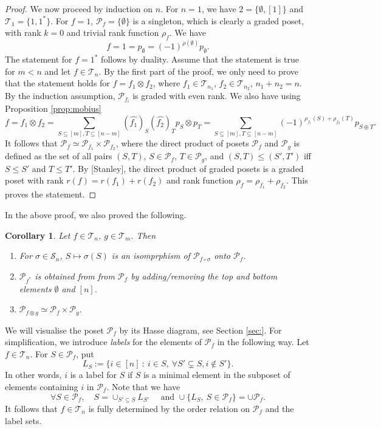 \documentclass[12pt]{article}
\newtheorem{coro}{Corollary}
\theoremstyle{definition}
\theoremstyle{remark}
\def\Te{\mathcal T}
\def\Pe{\mathcal P}
\def\permut{\mathscr{S}}
\begin{document}
\begin{proof}
We now proceed by induction on $n$. For $n=1$, we have $2=\{\emptyset, [1]\}$ and
$\Te_1=\{1,1^*\}$. For $f=1$, $\mathcal P_f=\{\emptyset\}$ is a singleton, which 
is clearly a graded poset, with rank $k=0$ and trivial rank function $\rho_f$.  We have
\[
f = 1=p_\emptyset=(-1)^{\rho(\emptyset)}p_\emptyset.
\]
The statement for $f=1^*$ follows by duality. Assume that the statement is true for $m<n$ and let $f\in \Te_n$.
 By the first part of the proof,  we only need to prove
that the statement holds for $f=f_1\otimes f_2$, where $f_1\in \Te_{n_1}$, $f_2\in
\Te_{n_2}$, $n_1+n_2=n$.  By the induction
assumption, $\Pe_{f_i}$ is graded with even rank. We also
have using Proposition \ref{prop:mobius}
\[
f=f_1\otimes f_2=\sum_{S\subseteq [m], T\subseteq [n-m]} (\widehat {f_1})_S(\widehat
{f_2})_T p_S\otimes p_T=
\sum_{S\subseteq [m], T\subseteq [n-m]}(-1)^{\rho_{f_1}(S)+\rho_{f_2}(T)}p_{S\oplus T}.
\]
It follows that $\Pe_f\simeq \Pe_{f_1}\times \Pe_{f_2}$, where the direct product of posets $\Pe_f$ and
$\Pe_g$ is defined as the set of all pairs $(S,T)$, $S\in \Pe_f$, $T\in \Pe_g$, and
$(S,T)\le (S',T')$ iff $S\le S'$ and $T\le T'$.
By [Stanley], the direct product of graded posets 
is a graded poset with rank $r(f)=r(f_1)+r(f_2)$ and rank function
$\rho_f=\rho_{f_1}+\rho_{f_2}$.  This
proves the statement. 

\end{proof}

In the above proof, we also proved the following.

\begin{coro}\label{coro:Pf} Let $f\in \Te_n$, $g\in \Te_m$. Then
\begin{enumerate}
\item[(i)] For $\sigma\in \permut_n$, $S\mapsto \sigma(S)$ is an
isomprphism  of  $\mathcal P_{f\circ \sigma}$ onto $\mathcal P_{f}$.
\item[(ii)] $\Pe_{f^*}$ is obtained from from $\Pe_f$ by adding/removing the top and bottom
elements $\emptyset$ and $[n]$.
\item[(iii)] $\Pe_{f\otimes g}\simeq \Pe_f\times \Pe_g$.
\end{enumerate}


\end{coro}


We will visualise the poset $\Pe_f$  by its Hasse diagram, see Section \ref{sec:}. For simplification, we 
introduce {\em labels} for the elements of $\Pe_f$ in the following way. 
Let $f\in \Te_n$. For  $S\in \Pe_f$, put
\[
L_S:=\{i\in [n]\ : \ i\in S,\ \forall S'\subsetneq S, i\notin S'\}.
\]
In other words, $i$ is a label for $S$ if $S$ is a minimal element in the subposet of
elements containing $i$ in  $\Pe_f$. 
Note that we have
\[
\forall S\in \Pe_f,\quad S=\cup_{S'\subseteq S} L_{S'}\quad \text{ and }\cup\{L_S, \ S\in
\Pe_f\}=\cup \Pe_f.
\]
It follows that $f\in \Te_n$ is fully determined by the order relation on $\Pe_f$ and the
label sets. 
\end{document}
